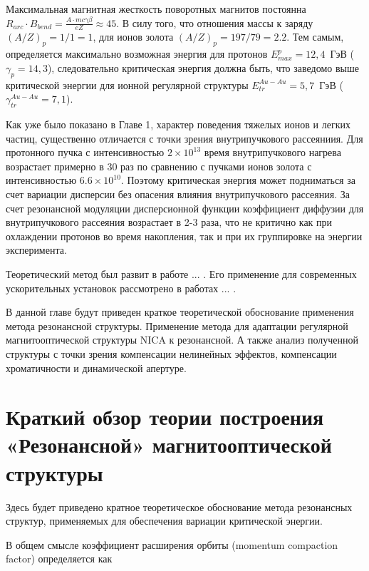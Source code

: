 \par Максимальная магнитная жесткость поворотных магнитов постоянна $R_{arc}\cdot B_{bend}=\frac{A\cdot m c\gamma\beta}{eZ}\approx45$. В силу того, что отношения массы к заряду $\left(A/Z\right)_{p}=1/1=1$, для ионов золота $\left(A/Z\right)_{p}=197/79=2.2$. Тем самым, определяется максимально возможная энергия для протонов $E_{max}^p=12,4$\ ГэВ ($\gamma_{p}=14,3$), следовательно критическая энергия должна быть, что заведомо выше критической энергии для ионной регулярной структуры $E_{tr}^{Au-Au}=5,7$\ ГэВ ( $\gamma_{tr}^{Au-Au}=7,1$).

\par Как уже было показано в Главе 1, характер поведения тяжелых ионов и легких частиц, существенно отличается с точки зрения внутрипучкового рассеяниия. Для протонного пучка с интенсивностью $2\times10^{13}$ время внутрипучкового нагрева возрастает примерно в 30 раз по сравнению с пучками ионов золота с интенсивностью $6.6\times10^{10}$. Поэтому критическая энергия может подниматься за счет вариации дисперсии без опасения влияния внутрипучкового рассеяния. За счет резонансной модуляции дисперсионной функции коэффициент диффузии для внутрипучкового рассеяния возрастает в 2-3 раза, что не критично как при охлаждении протонов во время накопления, так и при их группировке на энергии эксперимента.

\par Теоретический метод был развит в работе ... . Его применение для современных ускорительных установок рассмотрено в работах ... .

\par В данной главе будут приведен краткое теоретической обоснование применения метода резонансной структуры. Применение метода для адаптации регулярной магнитооптической структуры NICA к резонансной. А также анализ полученной структуры с точки зрения компенсации нелинейных эффектов, компенсации хроматичности и  динамической апертуре.
  
\section{Краткий обзор теории построения «Резонансной» магнитооптической структуры}\label{sec:transition_variation/methods/resonant}

Здесь будет приведено кратное теоретическое обоснование метода резонансных структур, применяемых для обеспечения вариации критической энергии.

В общем смысле коэффициент расширения орбиты (momentum compaction factor) определяется как 

